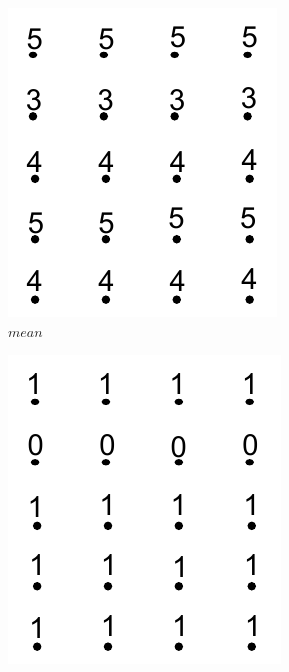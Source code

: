 \begin{figure}[!t]
\centering
\begin{subfigure}{0.18\linewidth}
\includegraphics[width=\linewidth]{Images/mean.pdf}
\caption{$mean$}
\label{}
\end{subfigure}
\hspace{2mm}
\begin{subfigure}{0.18\linewidth}
\includegraphics[width=\linewidth]{Images/bvolumeT.pdf}

\end{subfigure}
\end{figure}
